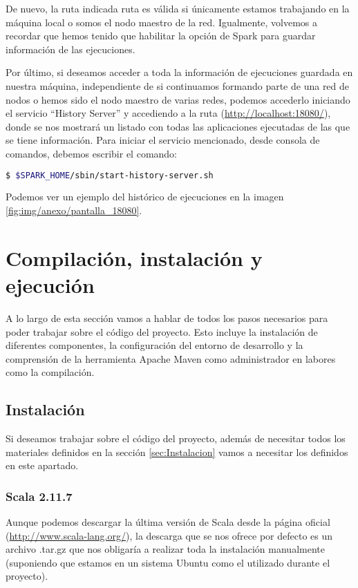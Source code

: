 
De nuevo, la ruta indicada ruta es válida si únicamente estamos trabajando en la máquina local o somos el nodo maestro de la red. Igualmente, volvemos a recordar que hemos tenido que habilitar la opción de Spark para guardar información de las ejecuciones.

Por último, si deseamos acceder a toda la información de ejecuciones guardada en nuestra máquina, independiente de si continuamos formando parte de una red de nodos o hemos sido el nodo maestro de varias redes, podemos accederlo iniciando el servicio ``History Server'' y accediendo a la ruta (\url{http://localhost:18080/}), donde se nos mostrará un listado con todas las aplicaciones ejecutadas de las que se tiene información. Para iniciar el servicio mencionado, desde consola de comandos, debemos escribir el comando:

\begin{lstlisting}[language=bash]
$ $SPARK_HOME/sbin/start-history-server.sh
\end{lstlisting}

Podemos ver un ejemplo del histórico de ejecuciones en la imagen \ref{fig:img/anexo/pantalla_18080}.


\section{Compilación, instalación y ejecución}

A lo largo de esta sección vamos a hablar de todos los pasos necesarios para poder trabajar sobre el código del proyecto. Esto incluye la instalación de diferentes componentes, la configuración del entorno de desarrollo y la comprensión de la herramienta Apache Maven como administrador en labores como la compilación.

\subsection{Instalación}

Si deseamos trabajar sobre el código del proyecto, además de necesitar todos los materiales definidos en la sección \ref{sec:Instalacion} vamos a necesitar los definidos en este apartado.

\subsubsection{Scala 2.11.7}
Aunque podemos descargar la última versión de Scala desde la página oficial (\url{http://www.scala-lang.org/}), la descarga que se nos ofrece por defecto es un archivo .tar.gz que nos obligaría a realizar toda la instalación manualmente (suponiendo que estamos en un sistema Ubuntu como el utilizado durante el proyecto).

